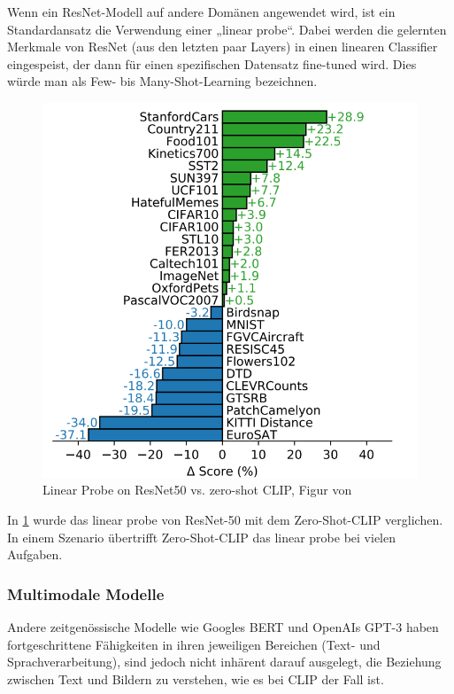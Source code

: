 \documentclass[nolibertine, ngerman, algorithm, nomencl, minted]{ttlab-qualify}
\begin{document}
Wenn ein ResNet-Modell auf andere Domänen angewendet wird, ist ein Standardansatz die Verwendung einer „linear probe“. 
Dabei werden die gelernten Merkmale von ResNet (aus den letzten paar Layers) in einen linearen Classifier eingespeist, 
der dann für einen spezifischen Datensatz fine-tuned wird. Dies würde man als Few- bis Many-Shot-Learning bezeichnen.

\begin{figure}[h]
	\centering
	\includegraphics[scale=0.5]{static/clip_vs_resnet50.png}
	\caption{Linear Probe on ResNet50 vs. zero-shot CLIP, Figur von \textcite{radford2021learning}}
	\label{fig:2.6}
\end{figure}


In \ref{fig:2.6} \parencite[vgl.][]{radford2021learning} wurde das linear probe von ResNet-50 mit dem Zero-Shot-CLIP verglichen. 
In einem Szenario übertrifft Zero-Shot-CLIP das linear probe bei vielen Aufgaben.

\subsubsection{Multimodale Modelle}
Andere zeitgenössische Modelle wie Googles BERT und OpenAIs GPT-3 haben fortgeschrittene 
Fähigkeiten in ihren jeweiligen Bereichen (Text- und Sprachverarbeitung), sind jedoch nicht 
inhärent darauf ausgelegt, die Beziehung zwischen Text und Bildern zu verstehen, 
wie es bei CLIP der Fall ist.
\end{document}
